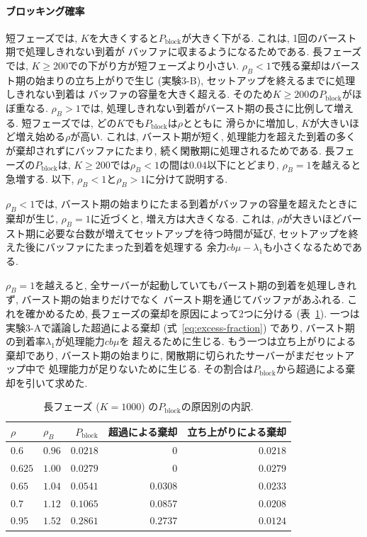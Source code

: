 \documentclass[a4paper, 11pt, dvipdfmx]{jsreport}
\begin{document}
\paragraph{ブロッキング確率}
短フェーズでは, $K$を大きくすると$P_{\mathrm{block}}$が大きく下がる. これは, 1回のバースト期で処理しきれない到着が
バッファに収まるようになるためである. 長フェーズでは, $K \ge 200$での下がり方が短フェーズより小さい.
$\rho_B < 1$で残る棄却はバースト期の始まりの立ち上がりで生じ (実験3-B), セットアップを終えるまでに処理しきれない到着は
バッファの容量を大きく超える. そのため$K \ge 200$の$P_{\mathrm{block}}$がほぼ重なる. $\rho_B > 1$では, 処理しきれない到着がバースト期の長さに比例して増える.
短フェーズでは, どの$K$でも$P_{\mathrm{block}}$は$\rho$とともに
滑らかに増加し, $K$が大きいほど増え始める$\rho$が高い. これは, バースト期が短く, 処理能力を超えた到着の多くが棄却されずにバッファにたまり,
続く閑散期に処理されるためである. 長フェーズの$P_{\mathrm{block}}$は, $K \ge 200$では$\rho_B < 1$の間は$0.04$以下にとどまり,
$\rho_B = 1$を越えると急増する.
以下, $\rho_B < 1$と$\rho_B > 1$に分けて説明する.

$\rho_B < 1$では, バースト期の始まりにたまる到着がバッファの容量を超えたときに棄却が生じ, $\rho_B = 1$に近づくと, 増え方は大きくなる.
これは, $\rho$が大きいほどバースト期に必要な台数が増えてセットアップを待つ時間が延び, セットアップを終えた後にバッファにたまった到着を処理する
余力$cb\mu - \lambda_1$も小さくなるためである.

$\rho_B = 1$を越えると, 全サーバーが起動していてもバースト期の到着を処理しきれず, バースト期の始まりだけでなく
バースト期を通じてバッファがあふれる. これを確かめるため, 長フェーズの棄却を原因によって2つに分ける (表~\ref{tab:exp4-split}).
一つは実験3-Aで議論した超過による棄却 (式~\eqref{eq:excess-fraction}) であり, バースト期の到着率$\lambda_1$が処理能力$cb\mu$を
超えるために生じる. もう一つは立ち上がりによる棄却であり, バースト期の始まりに, 閑散期に切られたサーバーがまだセットアップ中で
処理能力が足りないために生じる. その割合は$P_{\mathrm{block}}$から超過による棄却を引いて求めた.

\begin{table}[H]
\centering
\caption{長フェーズ ($K = 1000$) の$P_{\mathrm{block}}$の原因別の内訳.}
\label{tab:exp4-split}
\small
\begin{tabular}{llrrr}
\toprule
$\rho$ & $\rho_B$ & $P_{\mathrm{block}}$ & 超過による棄却 & 立ち上がりによる棄却 \\
\midrule
$0.6$   & $0.96$ & $0.0218$ & $0$      & $0.0218$ \\
$0.625$ & $1.00$ & $0.0279$ & $0$      & $0.0279$ \\
$0.65$  & $1.04$ & $0.0541$ & $0.0308$ & $0.0233$ \\
$0.7$   & $1.12$ & $0.1065$ & $0.0857$ & $0.0208$ \\
$0.95$  & $1.52$ & $0.2861$ & $0.2737$ & $0.0124$ \\
\bottomrule
\end{tabular}
\end{table}
\end{document}
